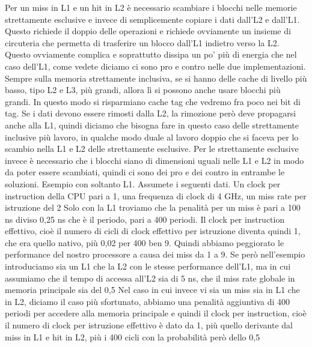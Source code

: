 Per un miss in L1 e un hit in L2 è necessario scambiare i blocchi nelle memorie strettamente esclusive e invece di semplicemente copiare i dati dall'L2 e dall'L1.
Questo richiede il doppio delle operazioni e richiede ovviamente un insieme di circuteria che permetta di trasferire un blocco dall'L1 indietro verso la L2.
Questo ovviamente complica e soprattutto dissipa un po' più di energia che nel caso dell'L1, come vedete diciamo ci sono pro e contro nelle due implementazioni.
Sempre sulla memoria strettamente inclusiva, se si hanno delle cache di livello più basso, tipo L2 e L3, più grandi, allora lì si possono anche usare blocchi più grandi.
In questo modo si risparmiano cache tag che vedremo fra poco nei bit di tag.
Se i dati devono essere rimosti dalla L2, la rimozione però deve propagarsi anche alla L1, quindi diciamo che bisogna fare in questo caso delle strettamente inclusive più lavoro, in qualche modo duale al lavoro doppio che si faceva per lo scambio nella L1 e L2 delle strettamente esclusive.
Per le strettamente esclusive invece è necessario che i blocchi siano di dimensioni uguali nelle L1 e L2 in modo da poter essere scambiati, quindi ci sono dei pro e dei contro in entrambe le soluzioni.
Esempio con soltanto L1.
Assumete i seguenti dati.
Un clock per instruction della CPU pari a 1, una frequenza di clock di 4 GHz, un miss rate per istruzione del 2%
Solo con la L1 troviamo che la penalità per un miss è pari a 100 ns diviso 0,25 ns che è il periodo, pari a 400 periodi.
Il clock per instruction effettivo, cioè il numero di cicli di clock effettivo per istruzione diventa quindi 1, che era quello nativo, più 0,02 per 400 ben 9.
Quindi abbiamo peggiorato le performance del nostro processore a causa dei miss da 1 a 9.
Se però nell'esempio introduciamo sia un L1 che la L2 con le stesse performance dell'L1, ma in cui assumiamo che il tempo di accessa all'L2 sia di 5 ns, che il miss rate globale in memoria principale sia del 0,5%
Nel caso in cui invece vi sia un miss sia in L1 che in L2, diciamo il caso più sfortunato, abbiamo una penalità aggiuntiva di 400 periodi per accedere alla memoria principale e quindi il clock per instruction, cioè il numero di clock per istruzione effettivo è dato da 1, più quello derivante dal miss in L1 e hit in L2, più i 400 cicli con la probabilità però dello 0,5%
